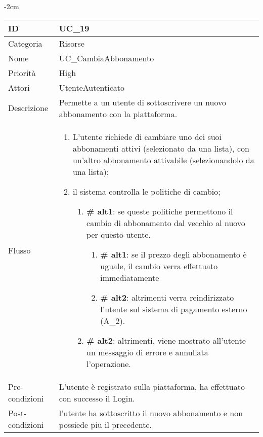 \begin{center}
\begin{table}[bp]
    \centering
    \addtolength{\leftskip} {-2cm}
\begin{tabular}{ |p{2.6cm}|p{13cm}|  }
\hline
ID & UC\_19 \\\hline
Categoria & Risorse\\\hline
Nome & UC\_CambiaAbbonamento\\\hline
Priorità & High \\\hline
Attori &  UtenteAutenticato \\\hline
Descrizione & Permette a un utente di sottoscrivere un nuovo abbonamento con la piattaforma.\\\hline
Flusso &  	\begin{enumerate}
			\item L'utente richiede di cambiare uno dei suoi abbonamenti attivi (selezionato da una lista), con un'altro abbonamento attivabile (selezionandolo da una lista);
			\item il sistema controlla le politiche di cambio;
			\begin{enumerate}[  ]
				\item \textbf{\# alt1}: se queste politiche permettono il cambio di abbonamento dal vecchio al nuovo per questo utente.
				\begin{enumerate}[label=\arabic*]
					\item \textbf{\# alt1}: se il prezzo degli abbonamento è uguale, il cambio verra effettuato immediatamente
					\item \textbf{\# alt2}: altrimenti verra reindirizzato l'utente sul sistema di pagamento esterno (A\_2).
				\end{enumerate}
				\item \textbf{\# alt2}: altrimenti, viene mostrato all'utente un messaggio di errore e annullata l'operazione.
			\end{enumerate}
			\end{enumerate}\\\hline
Pre-condizioni & L'utente è registrato sulla piattaforma, ha effettuato con successo il Login.\\\hline
Post-condizioni &  l'utente ha sottoscritto il nuovo abbonamento e non possiede piu il precedente.\\\hline
\end{tabular}
\label{table_use_case:19}\newline
\end{table}




\end{center}
